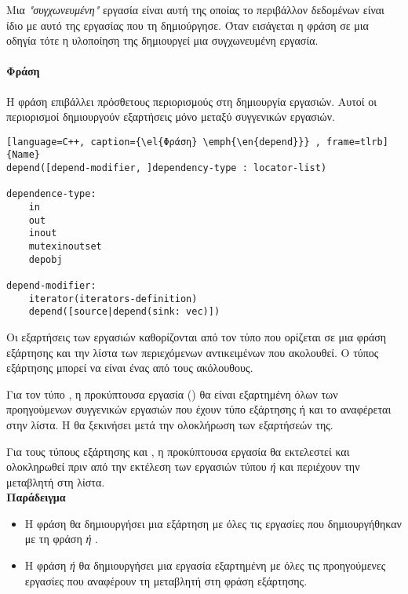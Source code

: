 Μια \emph{"συγχωνευμένη"} εργασία είναι αυτή της οποίας το περιβάλλον δεδομένων είναι ίδιο με αυτό της
εργασίας που τη δημιούργησε. Όταν εισάγεται η φράση \emph{} σε μια οδηγία \emph{} τότε η
υλοποίηση της δημιουργεί μια συγχωνευμένη εργασία.
\paragraph{Φράση }
\mbox{}

Η φράση \textbf{} επιβάλλει πρόσθετους περιορισμούς στη δημιουργία εργασιών. Αυτοί οι περιορισμοί
δημιουργούν εξαρτήσεις μόνο μεταξύ συγγενικών εργασιών.

\begin{spacing}{1.1}
\begin{lstlisting}[language=C++, caption={\el{Φράση} \emph{\en{depend}}} , frame=tlrb]{Name}
depend([depend-modifier, ]dependency-type : locator-list)

dependence-type:
	in
	out
	inout
	mutexinoutset
	depobj	
	
depend-modifier:
	iterator(iterators-definition)
	depend([source|depend(sink: vec)])
\end{lstlisting}
\end{spacing}
\clearpage
Οι εξαρτήσεις των εργασιών καθορίζονται από τον τύπο που ορίζεται σε μια φράση εξάρτησης και την λίστα των
περιεχόμενων αντικειμένων που ακολουθεί. Ο τύπος εξάρτησης μπορεί να είναι ένας από τους ακόλουθους\cite{oracle1}.

Για τον τύπο \textbf{}, η προκύπτουσα εργασία () θα είναι εξαρτημένη όλων των προηγούμενων συγγενικών
εργασιών που έχουν τύπο εξάρτησης \emph{} ή \emph{} και το \textbf{} αναφέρεται στην λίστα. Η
 θα ξεκινήσει μετά την ολοκλήρωση των εξαρτήσεών της.

Για τους τύπους εξάρτησης \emph{\textbf{}} και \emph{\textbf{}}, η προκύπτουσα εργασία  θα
εκτελεστεί και ολοκληρωθεί πριν από την εκτέλεση των εργασιών τύπου \emph{ ή } και περιέχουν την
μεταβλητή \textbf{} στη λίστα. \ \\

\textbf{Παράδειγμα}
\begin{itemize}
\item{Η φράση \emph{} θα δημιουργήσει μια εξάρτηση με όλες τις εργασίες που δημιουργήθηκαν με τη
φράση \emph{ ή }}.

\item{Η φράση \emph{ ή } θα δημιουργήσει μια εργασία εξαρτημένη με όλες τις
προηγούμενες εργασίες που αναφέρουν τη μεταβλητή \emph{} στη φράση εξάρτησης.}
\end{itemize}

